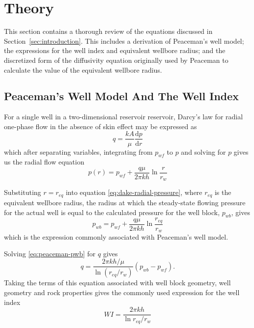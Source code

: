 
\section{Theory} %
\label{sec:theory}
This section contains a thorough review of the equations discussed in Section~\ref{sec:introduction}. This includes a derivation of Peaceman's well model; the expressions for the well index and equivalent wellbore radius; and the discretized form of the  diffusivity equation originally used by Peaceman to calculate the value of the equivalent wellbore radius.

\subsection{Peaceman's Well Model And The Well Index} %
\label{sub:well_indices}
For a single well in a two-dimensional reservoir reservoir, Darcy's law for radial one-phase flow in the absence of skin effect may be expressed as \cite{Dake1978Developments}
\begin{equation}
    \label{eq:darcy}
    q = \frac{kA}{\mu} \frac{\mathrm{d}p}{\mathrm{d}r}
\end{equation}
which after separating variables, integrating from $p_{wf}$ to $p$ and solving for $p$ gives us the radial flow equation
\begin{equation}
    \label{eq:dake-radial-pressure}
    p(r) = p_{wf} + \frac{q\mu}{2\pi kh} \ln{\frac{r}{r_w}}
\end{equation}

Substituting $r=r_{eq}$ into equation \eqref{eq:dake-radial-pressure}, where $r_{eq}$ is the equivalent wellbore radius, the radius at which the steady-state flowing pressure for the actual well is equal to the calculated pressure for the well block, $p_{wb}$, gives
\begin{equation}
    \label{eq:peaceman-pwb}
    p_{wb} = p_{wf} + \frac{q\mu}{2\pi kh} \ln{\frac{r_{eq}}{r_w}}
\end{equation}
which is the expression commonly associated with Peaceman's well model.

Solving \eqref{eq:peaceman-pwb} for $q$ gives
\begin{equation}
    \label{eq:peaceman-model-q}
    q = \frac{2\pi k h / \mu}{\ln (r_{eq}/{r_w})} \left( p_{wb} - p_{wf} \right).
\end{equation}
Taking the terms of this equation associated with well block geometry, well geometry and rock properties gives the commonly used expression for the well index
\begin{equation}
    \label{eq:peaceman-wi2}
    WI = \frac{2\pi kh}{\ln{r_{eq}/r_w}}
\end{equation}

